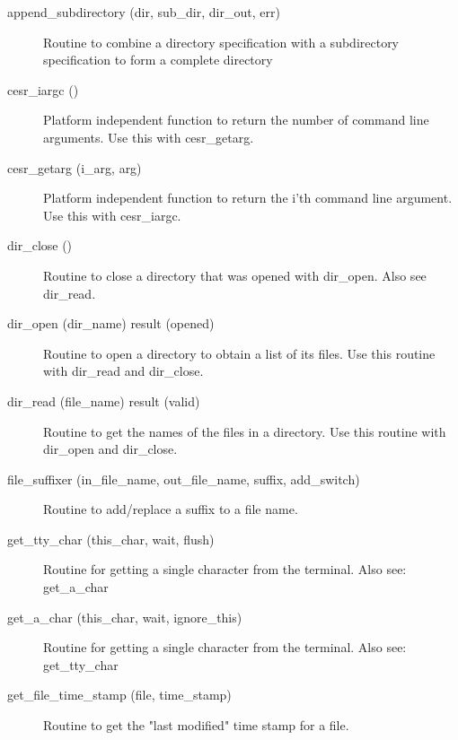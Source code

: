 \begin{description}

\label{r:append.subdirectory}
\item[append_subdirectory (dir, sub_dir, dir_out, err)] \Newline 
Routine to combine a directory specification with a 
subdirectory specification to form a complete directory

\label{r:cesr.iargc}
\item[cesr_iargc ()] \Newline 
Platform independent function to return the number of command
line arguments. Use this with cesr_getarg.

\label{r:cesr.getarg}
\item[cesr_getarg (i_arg, arg)] \Newline 
Platform independent function to return the i'th command
line argument. Use this with cesr_iargc.

\label{r:dir.close}
\item[dir_close () ] \Newline 
Routine to close a directory that was opened with dir_open.
Also see dir_read.

\label{r:dir.open}
\item[dir_open (dir_name) result (opened)] \Newline 
Routine to open a directory to obtain a list of its files.
Use this routine with dir_read and dir_close.

\label{r:dir.read}
\item[dir_read (file_name) result (valid)] \Newline 
Routine to get the names of the files in a directory.
Use this routine with dir_open and dir_close.

\label{r:file.suffixer}
\item[file_suffixer (in_file_name, out_file_name, suffix, add_switch)] \Newline 
Routine to add/replace a suffix to a file name.

\label{r:get.tty.char}
\item[get_tty_char (this_char, wait, flush)] \Newline 
Routine for getting a single character from the terminal.
Also see: get_a_char

\label{r:get.a.char}
\item[get_a_char (this_char, wait, ignore_this)] \Newline 
Routine for getting a single character from the terminal.
Also see: get_tty_char

\label{r:get.file.time.stamp}
\item[get_file_time_stamp (file, time_stamp)] \Newline 
Routine to get the "last modified" time stamp for a file.


\end{description}
